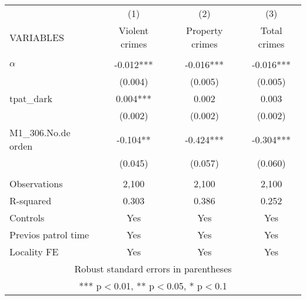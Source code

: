 \documentclass[]{article}
\begin{document}
\begin{tabular}{lccc} \hline
 & (1) & (2) & (3) \\
VARIABLES & Violent crimes & Property crimes & Total crimes \\ \hline
 &  &  &  \\
$\alpha$ & -0.012*** & -0.016*** & -0.016*** \\
 & (0.004) & (0.005) & (0.005) \\
tpat\_dark & 0.004*** & 0.002 & 0.003 \\
 & (0.002) & (0.002) & (0.002) \\
M1\_306.No.de orden & -0.104** & -0.424*** & -0.304*** \\
 & (0.045) & (0.057) & (0.060) \\
 &  &  &  \\
Observations & 2,100 & 2,100 & 2,100 \\
R-squared & 0.303 & 0.386 & 0.252 \\
Controls & Yes & Yes & Yes \\
Previos patrol time & Yes & Yes & Yes \\
 Locality FE & Yes & Yes & Yes \\ \hline
\multicolumn{4}{c}{ Robust standard errors in parentheses} \\
\multicolumn{4}{c}{ *** p$<$0.01, ** p$<$0.05, * p$<$0.1} \\
\end{tabular}
\end{document}
